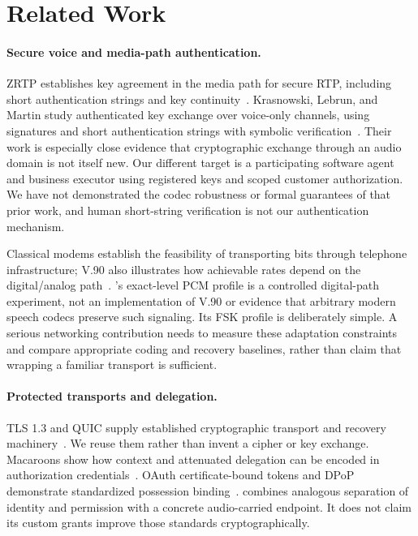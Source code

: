 \section{Related Work}
\label{sec:related}
\paragraph{Secure voice and media-path authentication.}
ZRTP establishes key agreement in the media path for secure RTP, including
short authentication strings and key continuity~\cite{rfc6189}. Krasnowski,
Lebrun, and Martin study authenticated key exchange over voice-only channels,
using signatures and short authentication strings with symbolic
verification~\cite{voicekeys}. Their work is especially close evidence that
cryptographic exchange through an audio domain is not itself new. Our different
target is a participating software agent and business executor using registered
keys and scoped customer authorization. We have not demonstrated the codec
robustness or formal guarantees of that prior work, and human short-string
verification is not our authentication mechanism.

Classical modems establish the feasibility of transporting bits through
telephone infrastructure; V.90 also illustrates how achievable rates depend
on the digital/analog path~\cite{v90}. \sys{}'s exact-level PCM profile is a
controlled digital-path experiment, not an implementation of V.90 or evidence
that arbitrary modern speech codecs preserve such signaling. Its FSK profile
is deliberately simple. A serious networking contribution needs to measure
these adaptation constraints and compare appropriate coding and recovery
baselines, rather than claim that wrapping a familiar transport is sufficient.

\paragraph{Protected transports and delegation.}
TLS 1.3 and QUIC supply established cryptographic transport and recovery
machinery~\cite{rfc8446,rfc9000,rfc9001,rfc9002}. We reuse them rather than
invent a cipher or key exchange. Macaroons show how context and attenuated
delegation can be encoded in authorization credentials~\cite{macaroons}.
OAuth certificate-bound tokens and DPoP demonstrate standardized possession
binding~\cite{rfc8705,rfc9449}. \sys{} combines analogous separation of
identity and permission with a concrete audio-carried endpoint. It does not
claim its custom grants improve those standards cryptographically.


